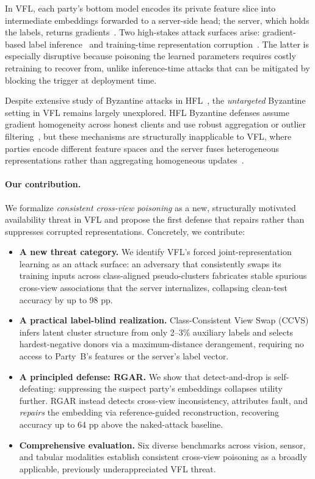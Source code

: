 \documentclass{article}
\begin{document}
In VFL, each party's bottom model encodes its private feature slice into
intermediate embeddings forwarded to a server-side head; the server, which
holds the labels, returns gradients~\citep{cheng2021secureboost}.
Two high-stakes attack surfaces arise: gradient-based label
inference~\citep{fu2022label,split_10296882} and training-time representation
corruption~\citep{naseri2023badvfl,gu2023lr}.
The latter is especially disruptive because poisoning the learned parameters
requires costly retraining to recover from, unlike inference-time attacks
that can be mitigated by blocking the trigger at deployment time.

Despite extensive study of Byzantine attacks in
HFL~\citep{fang2020local,blanchard2017machine}, the \emph{untargeted}
Byzantine setting in VFL remains largely unexplored.
HFL Byzantine defenses assume gradient homogeneity across honest clients and
use robust aggregation or outlier filtering~\citep{cao2022fltrust}, but
these mechanisms are structurally inapplicable to VFL, where parties encode
different feature spaces and the server fuses heterogeneous representations
rather than aggregating homogeneous updates~\citep{shi2022challenges}.

\paragraph{Our contribution.}
We formalize \emph{consistent cross-view poisoning} as a new, structurally
motivated availability threat in VFL and propose the first defense that
repairs rather than suppresses corrupted representations.
Concretely, we contribute:
\begin{itemize}
\item \textbf{A new threat category.}
  We identify VFL's forced joint-representation learning as an attack surface:
  an adversary that consistently swaps its training inputs across class-aligned
  pseudo-clusters fabricates stable spurious cross-view associations that the
  server internalizes, collapsing clean-test accuracy by up to 98 pp.

\item \textbf{A practical label-blind realization.}
  Class-Consistent View Swap (CCVS) infers latent cluster structure from
  only 2--3\% auxiliary labels and selects hardest-negative donors via a
  maximum-distance derangement, requiring no access to Party~B's features
  or the server's label vector.

\item \textbf{A principled defense: RGAR.}
  We show that detect-and-drop is self-defeating: suppressing the suspect
  party's embeddings collapses utility further.
  RGAR instead detects cross-view inconsistency, attributes fault, and
  \emph{repairs} the embedding via reference-guided reconstruction, recovering
  accuracy up to 64 pp above the naked-attack baseline.

\item \textbf{Comprehensive evaluation.}
  Six diverse benchmarks across vision, sensor, and tabular modalities
  establish consistent cross-view poisoning as a broadly applicable,
  previously underappreciated VFL threat.
\end{itemize}
\end{document}
